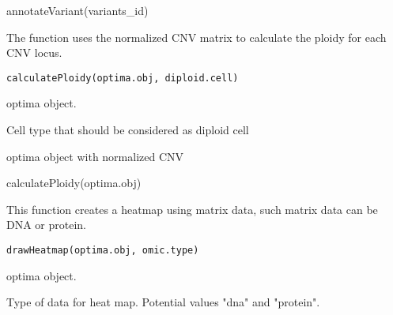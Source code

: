 \documentclass[a4paper]{book}
\begin{document}
%
\begin{Examples}
\begin{ExampleCode}
annotateVariant(variants_id)

\end{ExampleCode}
\end{Examples}
%
\begin{Description}\relax
The function uses the normalized CNV matrix to calculate the ploidy for each CNV locus.
\end{Description}
%
\begin{Usage}
\begin{verbatim}
calculatePloidy(optima.obj, diploid.cell)
\end{verbatim}
\end{Usage}
%
\begin{Arguments}
\begin{ldescription}
\item[\code{optima.obj}] optima object.

\item[\code{diploid.cell}] Cell type that should be considered as diploid cell
\end{ldescription}
\end{Arguments}
%
\begin{Value}
optima object with normalized CNV
\end{Value}
%
\begin{Examples}
\begin{ExampleCode}
calculatePloidy(optima.obj)
\end{ExampleCode}
\end{Examples}
%
\begin{Description}\relax
This function creates a heatmap using matrix data, such matrix
data can be DNA or protein.
\end{Description}
%
\begin{Usage}
\begin{verbatim}
drawHeatmap(optima.obj, omic.type)
\end{verbatim}
\end{Usage}
%
\begin{Arguments}
\begin{ldescription}
\item[\code{optima.obj}] optima object.

\item[\code{omic.type}] Type of data for heat map. Potential values "dna" and "protein".
\end{ldescription}
\end{Arguments}
\end{document}
